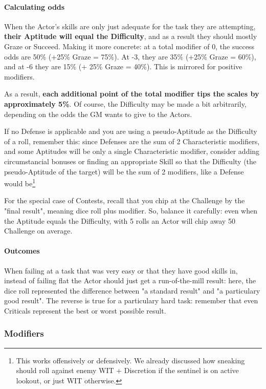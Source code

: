 \paragraph{Calculating odds}

When the Actor's skills are only just adequate for the task they are attempting, \textbf{their Aptitude will equal the Difficulty}, and as a result they should mostly Graze or Succeed. Making it more concrete: at a total modifier of 0, the success odds are 50\% (+25\% Graze = 75\%). At -3, they are 35\% (+25\% Graze = 60\%), and at -6 they are 15\% (+ 25\% Graze = 40\%). This is mirrored for positive modifiers. 

As a result, \textbf{each additional point of the total modifier tips the scales by approximately 5\%}. Of course, the Difficulty may be made a bit arbitrarily, depending on the odds the GM wants to give to the Actors. 


If no Defense is applicable and you are using a pseudo-Aptitude as the Difficulty of a roll, remember this: since Defenses are the sum of 2 Characteristic modifiers, and some Aptitudes will be only a single Characteristic modifier, consider adding circumstancial bonuses or finding an appropriate Skill so that the Difficulty (the pseudo-Aptitude of the target) will be the sum of 2 modifiers, like a Defense would be\footnote{This works offensively or defensively. We already discussed how sneaking should roll against enemy WIT + Discretion if the sentinel is on active lookout, or just WIT otherwise.}

For the special case of Contests, recall that you chip at the Challenge by the "final result", meaning dice roll plus modifier. So, balance it carefully: even when the Aptitude equals the Difficulty, with 5 rolls an Actor will chip away 50 Challenge on average.


\paragraph{Outcomes}

When failing at a task that was very easy or that they have good skills in, instead of failing flat the Actor should just get a run-of-the-mill result: here, the dice roll represented the difference between "a standard result" and "a particulary good result". The reverse is true for a particulary hard task: remember that even Criticals represent the best or worst possible result.

\subsubsection{Modifiers}

